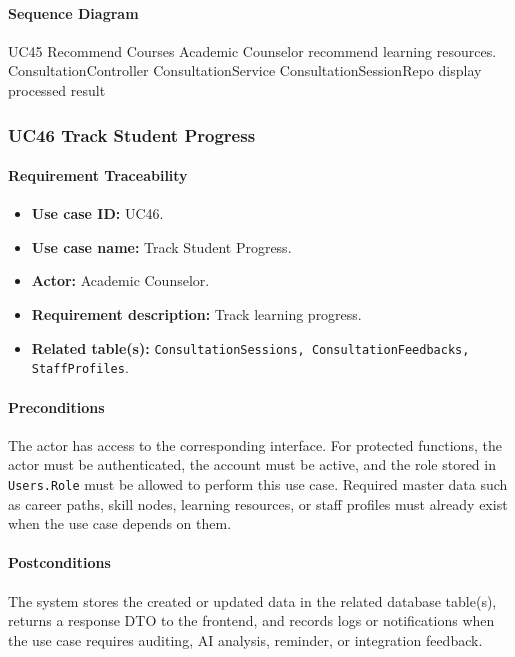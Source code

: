 \paragraph{Sequence Diagram}

\SequenceDiagram
{UC45 Recommend Courses}
{Academic Counselor}
{recommend learning resources.}
{ConsultationController}
{ConsultationService}
{ConsultationSessionRepo}
{display processed result}

\subsubsection{UC46 Track Student Progress}

\paragraph{Requirement Traceability}

\begin{itemize}
    \item \textbf{Use case ID:} UC46.
    \item \textbf{Use case name:} Track Student Progress.
    \item \textbf{Actor:} Academic Counselor.
    \item \textbf{Requirement description:} Track learning progress.
    \item \textbf{Related table(s):} \texttt{ConsultationSessions, ConsultationFeedbacks, StaffProfiles}.
\end{itemize}

\paragraph{Preconditions}

The actor has access to the corresponding interface. For protected functions, the actor must be authenticated, the account must be active, and the role stored in \texttt{Users.Role} must be allowed to perform this use case. Required master data such as career paths, skill nodes, learning resources, or staff profiles must already exist when the use case depends on them.

\paragraph{Postconditions}

The system stores the created or updated data in the related database table(s), returns a response DTO to the frontend, and records logs or notifications when the use case requires auditing, AI analysis, reminder, or integration feedback.

